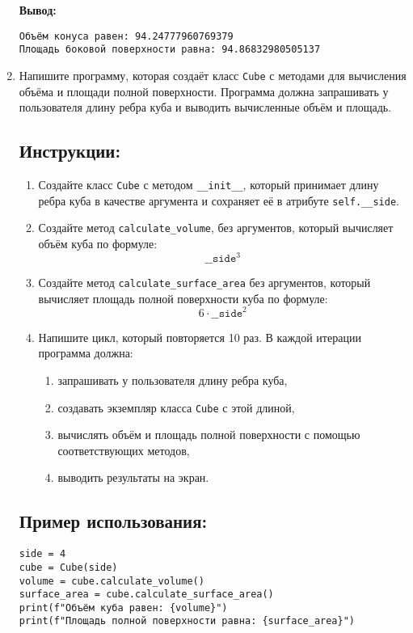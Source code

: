 \begin{enumerate}
\textbf{Вывод:}
\begin{verbatim}
Объём конуса равен: 94.24777960769379
Площадь боковой поверхности равна: 94.86832980505137
\end{verbatim}

\item
Напишите программу, которая создаёт класс \texttt{Cube} с методами для вычисления объёма
и площади полной поверхности. Программа должна запрашивать у пользователя длину ребра куба
и выводить вычисленные объём и площадь.

\subsection*{Инструкции:}
\begin{enumerate}
\item Создайте класс \texttt{Cube} с методом
\texttt{\_\_init\_\_}, который принимает длину ребра куба в
качестве аргумента и сохраняет её в атрибуте \texttt{self.\_\_side}.

\item Создайте метод \texttt{calculate\_volume},
без аргументов, который вычисляет объём куба по формуле:
\[
\texttt{\_\_side}^3
\]

\item Создайте метод \texttt{calculate\_surface\_area} без аргументов,
который вычисляет площадь полной поверхности куба по формуле:
\[
6 \cdot \texttt{\_\_side}^2
\]

\item Напишите цикл, который повторяется 10 раз. В каждой итерации программа должна:
\begin{enumerate}
\item запрашивать у пользователя длину ребра куба,
\item создавать экземпляр класса \texttt{Cube} с этой длиной,
\item вычислять объём и площадь полной поверхности с помощью соответствующих методов,
\item выводить результаты на экран.
\end{enumerate}
\end{enumerate}

\subsection*{Пример использования:}
\begin{verbatim}
side = 4
cube = Cube(side)
volume = cube.calculate_volume()
surface_area = cube.calculate_surface_area()
print(f"Объём куба равен: {volume}")
print(f"Площадь полной поверхности равна: {surface_area}")
\end{verbatim}


\end{enumerate}
